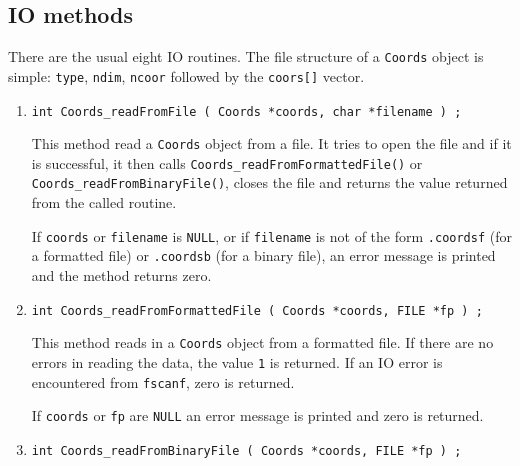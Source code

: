 \subsection{IO methods}
\label{subsection:Coords:proto:IO}
\par
There are the usual eight IO routines.
The file structure of a {\tt Coords} object is simple:
{\tt type}, {\tt ndim}, {\tt ncoor}
followed by the {\tt coors[]} vector.
\par
\begin{enumerate}
\item
\begin{verbatim}
int Coords_readFromFile ( Coords *coords, char *filename ) ;
\end{verbatim}
\par
This method read a {\tt Coords} object from a file.
It tries to open the file and if it is successful, 
it then calls {\tt Coords\_readFromFormattedFile()} or
{\tt Coords\_readFromBinaryFile()}, 
closes the file
and returns the value returned from the called routine.
\par {}
If {\tt coords} or {\tt filename} is {\tt NULL}, 
or if {\tt filename} is not of the form
{\tt *.coordsf} (for a formatted file) 
or {\tt *.coordsb} (for a binary file),
an error message is printed and the method returns zero.
\item
\begin{verbatim}
int Coords_readFromFormattedFile ( Coords *coords, FILE *fp ) ;
\end{verbatim}
\par
This method reads in a {\tt Coords} object from a formatted file.
If there are no errors in reading the data, 
the value {\tt 1} is returned.
If an IO error is encountered from {\tt fscanf}, zero is returned.
\par {}
If {\tt coords} or {\tt fp} are {\tt NULL} 
an error message is printed and zero is returned.
\item
\begin{verbatim}
int Coords_readFromBinaryFile ( Coords *coords, FILE *fp ) ;

\end{verbatim}
\end{enumerate}
